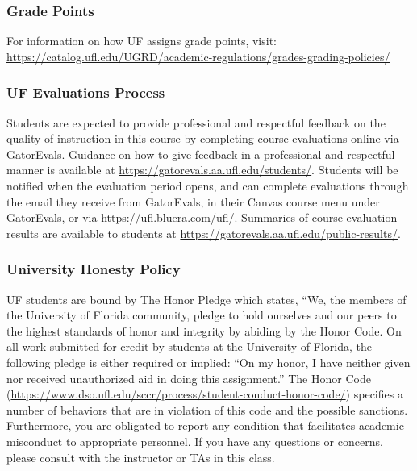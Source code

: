 \documentclass[
  12pt,
]{article}
\begin{document}
\hypertarget{grade-points}{%
\subsubsection{Grade Points}\label{grade-points}}

For information on how UF assigns grade points, visit:
\url{https://catalog.ufl.edu/UGRD/academic-regulations/grades-grading-policies/}

\hypertarget{uf-evaluations-process}{%
\subsubsection{\texorpdfstring{\textbf{UF Evaluations
Process}}{UF Evaluations Process}}\label{uf-evaluations-process}}

Students are expected to provide professional and respectful feedback on
the quality of instruction in this course by completing course
evaluations online via GatorEvals. Guidance on how to give feedback in a
professional and respectful manner is available at
\url{https://gatorevals.aa.ufl.edu/students/}. Students will be notified
when the evaluation period opens, and can complete evaluations through
the email they receive from GatorEvals, in their Canvas course menu
under GatorEvals, or via \url{https://ufl.bluera.com/ufl/}. Summaries of
course evaluation results are available to students at
\url{https://gatorevals.aa.ufl.edu/public-results/}.

\hypertarget{university-honesty-policy}{%
\subsubsection{\texorpdfstring{\textbf{University Honesty
Policy}}{University Honesty Policy}}\label{university-honesty-policy}}

UF students are bound by The Honor Pledge which states, ``We, the
members of the University of Florida community, pledge to hold ourselves
and our peers to the highest standards of honor and integrity by abiding
by the Honor Code. On all work submitted for credit by students at the
University of Florida, the following pledge is either required or
implied: ``On my honor, I have neither given nor received unauthorized
aid in doing this assignment.'' The Honor Code
(\url{https://www.dso.ufl.edu/sccr/process/student-conduct-honor-code/})
specifies a number of behaviors that are in violation of this code and
the possible sanctions. Furthermore, you are obligated to report any
condition that facilitates academic misconduct to appropriate personnel.
If you have any questions or concerns, please consult with the
instructor or TAs in this class.
\end{document}

